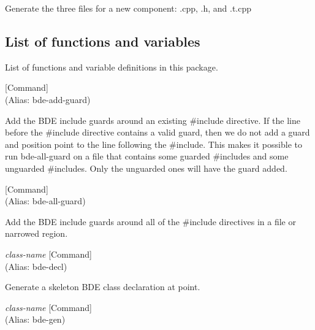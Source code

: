 \begin{doc-string}
Generate the three files for a new component: .cpp, .h, and .t.cpp
\end{doc-string}

\subsection{List of functions and variables}

List of functions and variable definitions in this package.



\vspace{1em}
\noindent
{}
\usebox{\funcname}
 \hfill [Command]\\%
 (Alias: bde-add-guard)

\begin{doc-string}
Add the BDE include guards around an existing \#include directive.  If the line
before the \#include directive contains a valid guard, then we do not add a guard
and position point to the line following the \#include.  This makes it possible to
run bde-all-guard on a file that contains some guarded \#includes and some unguarded
\#includes.  Only the unguarded ones will have the guard added.
\end{doc-string}

\vspace{1em}
\noindent
{}
\usebox{\funcname}
 \hfill [Command]\\%
 (Alias: bde-all-guard)

\begin{doc-string}
Add the BDE include guards around all of the \#include directives in a file
or narrowed region.
\end{doc-string}

\vspace{1em}
\noindent
{}
\usebox{\funcname}\emph{class-name}
 \hfill [Command]\\%
 (Alias: bde-decl)

\begin{doc-string}
Generate a skeleton BDE class declaration at point.
\end{doc-string}

\vspace{1em}
\noindent
{}
\usebox{\funcname}\emph{class-name}
 \hfill [Command]\\%
 (Alias: bde-gen)

